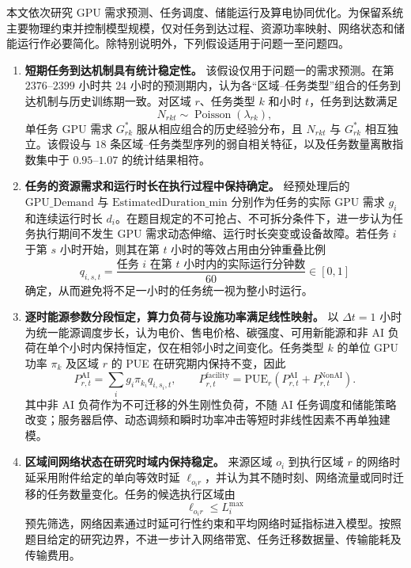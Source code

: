 \documentclass[UTF8,a4paper,zihao=-4]{ctexart}
\begin{document}
本文依次研究 GPU 需求预测、任务调度、储能运行及算电协同优化。为保留系统主要物理约束并控制模型规模，仅对任务到达过程、资源功率映射、网络状态和储能运行作必要简化。除特别说明外，下列假设适用于问题一至问题四。

\begin{enumerate}[
    label=\textbf{假设\arabic*：},
    leftmargin=5.5em,
    labelsep=0.5em,
    itemsep=0.55em,
    parsep=0pt,
    topsep=0.6em
]
    \item \textbf{短期任务到达机制具有统计稳定性。}
    该假设仅用于问题一的需求预测。在第 $2376$--$2399$ 小时共 $24$ 小时的预测期内，认为各“区域--任务类型”组合的任务到达机制与历史训练期一致。对区域 $r$、任务类型 $k$ 和小时 $t$，任务到达数满足
    \[
    N_{rkt}\sim\operatorname{Poisson}(\lambda_{rk}),
    \]
    单任务 GPU 需求 $G_{rk}^{*}$ 服从相应组合的历史经验分布，且 $N_{rkt}$ 与 $G_{rk}^{*}$ 相互独立。该假设与 $18$ 条区域--任务类型序列的弱自相关特征，以及任务数量离散指数集中于 $0.95$--$1.07$ 的统计结果相符。

    \item \textbf{任务的资源需求和运行时长在执行过程中保持确定。}
    经预处理后的 $\mathrm{GPU\_Demand}$ 与 $\mathrm{EstimatedDuration\_min}$ 分别作为任务的实际 GPU 需求 $g_i$ 和连续运行时长 $d_i$。在题目规定的不可抢占、不可拆分条件下，进一步认为任务执行期间不发生 GPU 需求动态伸缩、运行时长突变或设备故障。若任务 $i$ 于第 $s$ 小时开始，则其在第 $t$ 小时的等效占用由分钟重叠比例
    \[
    q_{i,s,t}
    =
    \frac{\text{任务 $i$ 在第 $t$ 小时内的实际运行分钟数}}{60}
    \in[0,1]
    \]
    确定，从而避免将不足一小时的任务统一视为整小时运行。

    \item \textbf{逐时能源参数分段恒定，算力负荷与设施功率满足线性映射。}
    以 $\Delta t=1$ 小时为统一能源调度步长，认为电价、售电价格、碳强度、可用新能源和非 AI 负荷在单个小时内保持恒定，仅在相邻小时之间变化。任务类型 $k$ 的单位 GPU 功率 $\pi_k$ 及区域 $r$ 的 PUE 在研究期内保持不变，因此
    \[
    P_{r,t}^{\mathrm{AI}}
    =
    \sum_i g_i\pi_{k_i}q_{i,s_i,t},
    \qquad
    P_{r,t}^{\mathrm{facility}}
    =
    \mathrm{PUE}_r
    \left(
    P_{r,t}^{\mathrm{AI}}
    +
    P_{r,t}^{\mathrm{NonAI}}
    \right).
    \]
    其中非 AI 负荷作为不可迁移的外生刚性负荷，不随 AI 任务调度和储能策略改变；服务器启停、动态调频和瞬时功率冲击等短时非线性因素不再单独建模。

    \item \textbf{区域间网络状态在研究时域内保持稳定。}
    来源区域 $o_i$ 到执行区域 $r$ 的网络时延采用附件给定的单向等效时延 $\ell_{o_i r}$，并认为其不随时刻、网络流量或同时迁移的任务数量变化。任务的候选执行区域由
    \[
    \ell_{o_i r}\leq L_i^{\max}
    \]
    预先筛选，网络因素通过时延可行性约束和平均网络时延指标进入模型。按照题目给定的研究边界，不进一步计入网络带宽、任务迁移数据量、传输能耗及传输费用。


\end{enumerate}
\end{document}
